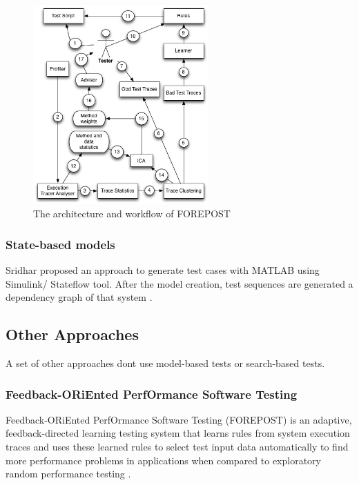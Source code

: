 \documentclass{report}
\begin{document}
\begin{figure}[!ht]
\centering
\includegraphics[width=0.6\textwidth]{./images/FOREPOST.png}
\caption{The architecture and workflow of FOREPOST}
\label{fig:forepost}

\end{figure}


\subsubsection{State-based models}


Sridhar proposed an approach to generate test cases with MATLAB using Simulink/ Stateflow tool. After the model creation, test sequences are generated a dependency graph of that system \cite{Sridhar2013}. 




\subsection{Other Approaches}

A set of other approaches dont use model-based tests or search-based tests.

\subsubsection{Feedback-ORiEnted PerfOrmance Software Testing}

Feedback-ORiEnted PerfOrmance Software Testing (FOREPOST) is an adaptive, feedback-directed learning testing system that learns rules from system execution traces and uses these learned rules to select test input data automatically to find more performance problems in applications when compared to exploratory random performance testing \cite{Grechanik2012}.
\end{document}
